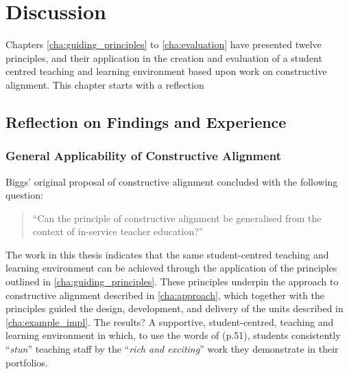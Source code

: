 
\chapter{Discussion} %
\label{cha:discussion}


Chapters \ref{cha:guiding_principles} to \ref{cha:evaluation} have presented twelve principles, and their application in the creation and evaluation of a student centred teaching and learning environment based upon \citet{Biggs:1996c} work on constructive alignment. This chapter starts with a reflection


\section{Reflection on Findings and Experience} %
\label{sec:reflection_on_findings_and_experience}

\subsection{General Applicability of Constructive Alignment} %
\label{sub:general_applicability_of_constructive_alignment}

Biggs' original proposal of constructive alignment concluded with the following question:

\begin{quote}
	``Can the principle of constructive alignment be generalised from the context of in-service teacher education?'' \citet{Biggs:1996c}
\end{quote}

The work in this thesis indicates that the same student-centred teaching and learning environment can be achieved through the application of the principles outlined in \cref{cha:guiding_principles}. These principles underpin the approach to constructive alignment described in \cref{cha:approach}, which together with the principles guided the design, development, and delivery of the units described in \cref{cha:example_impl}. The results? A supportive, student-centred, teaching and learning environment in which, to use the words of \citet{Biggs:2007} (p.51), students consistently ``\emph{stun}'' teaching staff by the ``\emph{rich and exciting}'' work they demonstrate in their portfolios.

